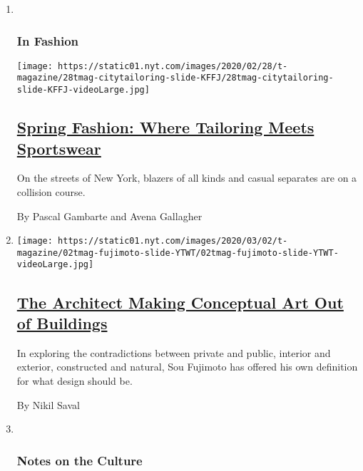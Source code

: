 \begin{enumerate}
\def\labelenumi{\arabic{enumi}.}
\item ~
  \hypertarget{in-fashion}{%
  \subsubsection{In Fashion}\label{in-fashion}}

  \texttt{[image: https://static01.nyt.com/images/2020/02/28/t-magazine/28tmag-citytailoring-slide-KFFJ/28tmag-citytailoring-slide-KFFJ-videoLarge.jpg]}

  \hypertarget{spring-fashion-where-tailoring-meets-sportswear}{%
  \subsection{\texorpdfstring{\href{/2020/02/28/t-magazine/spring-mens-fashion-tailoring.html}{Spring
  Fashion: Where Tailoring Meets
  Sportswear}}{Spring Fashion: Where Tailoring Meets Sportswear}}\label{spring-fashion-where-tailoring-meets-sportswear}}

  On the streets of New York, blazers of all kinds and casual separates
  are on a collision course.

  By Pascal Gambarte and Avena Gallagher
\item
  \texttt{[image: https://static01.nyt.com/images/2020/03/02/t-magazine/02tmag-fujimoto-slide-YTWT/02tmag-fujimoto-slide-YTWT-videoLarge.jpg]}

  \hypertarget{the-architect-making-conceptual-art-out-of-buildings}{%
  \subsection{\texorpdfstring{\href{/2020/03/02/t-magazine/sou-fujimoto.html}{The
  Architect Making Conceptual Art Out of
  Buildings}}{The Architect Making Conceptual Art Out of Buildings}}\label{the-architect-making-conceptual-art-out-of-buildings}}

  In exploring the contradictions between private and public, interior
  and exterior, constructed and natural, Sou Fujimoto has offered his
  own definition for what design should be.

  By Nikil Saval
\item ~
  \hypertarget{notes-on-the-culture}{%
  \subsubsection{Notes on the Culture}\label{notes-on-the-culture}}


\end{enumerate}
